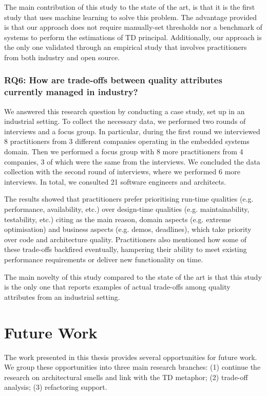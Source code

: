 The main contribution of this study to the state of the art, is that it is the first study that uses machine learning to solve this problem.
The advantage provided is that our approach does not require manually-set thresholds nor a benchmark of systems to perform the estimations of TD principal.
Additionally, our approach is the only one validated through an empirical study that involves practitioners from both industry and open source.

\subsubsection*{RQ6: How are trade-offs between quality attributes currently managed in industry?}
We answered this research question by conducting a case study, set up in an industrial setting.
To collect the necessary data, we performed two rounds of interviews and a focus group.
In particular, during the first round we interviewed 8 practitioners from 3 different companies operating in the embedded systems domain.
Then we performed a focus group with 8 more practitioners from 4 companies, 3 of which were the same from the interviews.
We concluded the data collection with the second round of interviews, where we performed 6 more interviews.
In total, we consulted 21 software engineers and architects.

The results showed that practitioners prefer prioritising run-time qualities (e.g. performance, availability, etc.) over design-time qualities (e.g. maintainability, testability, etc.) citing as the main reason, domain aspects (e.g. extreme optimisation) and business aspects (e.g. demos, deadlines), which take priority over code and architecture quality.
Practitioners also mentioned how some of these trade-offs backfired eventually, hampering their ability to meet existing performance requirements or deliver new functionality on time. 

The main novelty of this study compared to the state of the art is that this study is the only one that reports examples of actual trade-offs among quality attributes from an industrial setting.

\section{Future Work}\label{c8:sec:future-work}
The work presented in this thesis provides several opportunities for future work.
We group these opportunities into three main research branches:
(1) continue the research on architectural smells and link with the TD metaphor; (2) trade-off analysis; (3) refactoring support.


